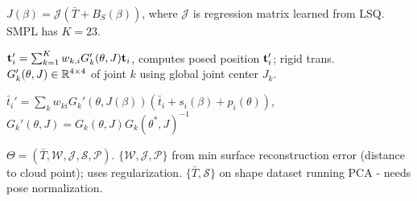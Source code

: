 \begin{definition}
    \(J(\beta) = \mathcal J(\bar T + B_S(\beta))\), where \(\mathcal J\) is regression matrix learned from LSQ. SMPL has \(K = 23\).
\end{definition}

\begin{definition}[LBS]
    \(\vb t_i' = \sum_{k=1}^K w_{k, i} G_k'(\theta, J)\vb t_i\), computes posed position \(\vb t_i'\); rigid trans. \(G_k'(\theta, J) \in \mathbb{R}^{4 \times 4}\) of joint \(k\) using global joint center \(J_k\).
\end{definition}

\begin{definition}[SMPL LBS]
    \(\bar t_i' = \sum_{k} w_{ki} G_k'(\theta, J(\beta))(\bar t_i + s_i(\beta) + p_i(\theta))\), \(G_k'(\theta, J) = G_k(\theta, J) G_k(\theta^*, J)^{-1}\)
\end{definition}

\begin{definition}
    \(\Theta = (\bar T, \mathcal W, \mathcal J, \mathcal S, \mathcal P)\). \(\{\mathcal W, \mathcal J, \mathcal P\}\) from min surface reconstruction error (distance to cloud point); uses regularization. \(\{\bar T, \mathcal S\}\) on shape dataset running PCA - needs pose normalization.
\end{definition}
